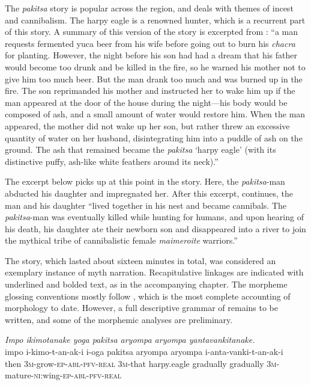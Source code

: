 \documentclass[output=paper]{LSP/langsci}
\begin{document}
The \textit{pakitsa} story is popular across the region, and deals with themes of incest and cannibalism. The harpy eagle is a renowned hunter, which is a recurrent part of this story. A summary of this version of the story is excerpted from \citet[][255--256]{emlen14}: ``a man requests fermented yuca beer from his wife before going out to burn his \textit{chacra} for planting. However, the night before his son had had a dream that his father would become too drunk and be killed in the fire, so he warned his mother not to give him too much beer. But the man drank too much and was burned up in the fire. The son reprimanded his mother and instructed her to wake him up if the man appeared at the door of the house during the night—his body would be composed of ash, and a small amount of water would restore him. When the man appeared, the mother did not wake up her son, but rather threw an excessive quantity of water on her husband, disintegrating him into a puddle of ash on the ground. The ash that remained became the \textit{pakitsa} `harpy eagle' (with its distinctive puffy, ash-like white feathers around its neck).'' 

The excerpt below picks up at this point in the story. Here, the \textit{pakitsa}-man abducted his daughter and impregnated her. After this excerpt, \citet[][256]{emlen14} continues, the man and his daughter ``lived together in his nest and became cannibals. The \textit{pakitsa}-man was eventually killed while hunting for humans, and upon hearing of his death, his daughter ate their newborn son and disappeared into a river to join the mythical tribe of cannibalistic female \textit{maimeroite} warriors.'' 

The story, which lasted about sixteen minutes in total, was considered an exemplary instance of myth narration. Recapitulative linkages are indicated with underlined and bolded text, as in the accompanying chapter. The morpheme glossing conventions mostly follow \citet{vargas13}, which is the most complete accounting of   morphology to date. However, a full descriptive grammar of  remains to be written, and some of the morphemic analyses are preliminary.


\begin{exe}
\ex \label{Emapp01}
\glt \textit{Impo ikimotanake yoga pakitsa aryompa aryompa yantavankitanake.}\\
\gll impo i-kimo-t-an-ak-i i-oga pakitsa aryompa aryompa i-anta-vanki-t-an-ak-i\\
then \textsc{3m-}grow\textsc{-ep-abl-pfv-real} \textsc{3m-}that harpy.eagle gradually gradually \textsc{3m-}mature-\textsc{ni:}wing\textsc{-ep-abl-pfv-real}\\
\glt {}\\
\end{exe}
\end{document}
